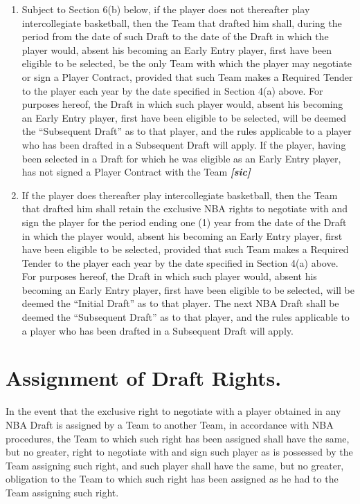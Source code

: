 \documentclass[
]{book}
\providecommand{\tightlist}{%
  \setlength{\itemsep}{0pt}\setlength{\parskip}{0pt}}
\begin{document}
\begin{enumerate}
\def\labelenumi{(\alph{enumi})}
\tightlist
\item
  Subject to Section 6(b) below, if the player does not thereafter play intercollegiate basketball, then the Team that drafted him shall, during the period from the date of such Draft to the date of the Draft in which the player would, absent his becoming an Early Entry player, first have been eligible to be selected, be the only Team with which the player may negotiate or sign a Player Contract, provided that such Team makes a Required Tender to the player each year by the date specified in Section 4(a) above. For purposes hereof, the Draft in which such player would, absent his becoming an Early Entry player, first have been eligible to be selected, will be deemed the ``Subsequent Draft'' as to that player, and the rules applicable to a player who has been drafted in a Subsequent Draft will apply. If the player, having been selected in a Draft for which he was eligible as an Early Entry player, has not signed a Player Contract with the Team \textbf{\emph{{[}sic{]}}}
\item
  If the player does thereafter play intercollegiate basketball, then the Team that drafted him shall retain the exclusive NBA rights to negotiate with and sign the player for the period ending one (1) year from the date of the Draft in which the player would, absent his becoming an Early Entry player, first have been eligible to be selected, provided that such Team makes a Required Tender to the player each year by the date specified in Section 4(a) above. For purposes hereof, the Draft in which such player would, absent his becoming an Early Entry player, first have been eligible to be selected, will be deemed the ``Initial Draft'' as to that player. The next NBA Draft shall be deemed the ``Subsequent Draft'' as to that player, and the rules applicable to a player who has been drafted in a Subsequent Draft will apply.
\end{enumerate}

\hypertarget{assignment-of-draft-rights.}{%
\section{Assignment of Draft Rights.}\label{assignment-of-draft-rights.}}

In the event that the exclusive right to negotiate with a player obtained in any NBA Draft is assigned by a Team to another Team, in accordance with NBA procedures, the Team to which such right has been assigned shall have the same, but no greater, right to negotiate with and sign such player as is possessed by the Team assigning such right, and such player shall have the same, but no greater, obligation to the Team to which such right has been assigned as he had to the Team assigning such right.
\end{document}

